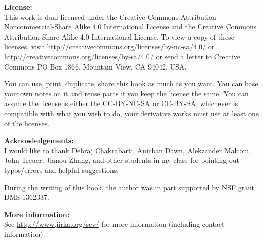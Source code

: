 \documentclass[12pt,openany]{book}
\theoremstyle{plain}
\theoremstyle{remark}
\theoremstyle{definition}
\theoremstyle{exercise}
\theoremstyle{example}
\begin{document}
\bigskip

\noindent
\textbf{License:}
\\
This work is dual licensed under
the Creative Commons
Attribution-Non\-commercial-Share Alike 4.0 International License and
the Creative Commons
Attribution-Share Alike 4.0 International License.
To view a
copy of these licenses, visit
\url{http://creativecommons.org/licenses/by-nc-sa/4.0/}
or
\url{http://creativecommons.org/licenses/by-sa/4.0/}
or send a letter to
Creative Commons
PO Box 1866, Mountain View, CA 94042, USA.

\bigskip

\noindent
You can use, print, duplicate, share this book as much as you want.  You can
base your own notes on it and reuse parts if you keep the license the
same.  You can assume the license is either the CC-BY-NC-SA or CC-BY-SA,
whichever is compatible with what you wish to do, your derivative works must
use at least one of the licenses.

\bigskip

\noindent
\textbf{Acknowledgements:}
\\
I would like to thank Debraj Chakrabarti, Anirban Dawn, Alekzander Malcom,
John Treuer,
Jianou Zhang, and other students in my class for pointing out typos/errors
and helpful suggestions. 

\bigskip

\noindent
During the writing of this book, 
the author was in part supported by NSF grant DMS-1362337.

\bigskip

\noindent
\textbf{More information:}
\\
See \url{http://www.jirka.org/scv/} for more information
(including contact information).



\tableofcontents
{}

\end{document}
